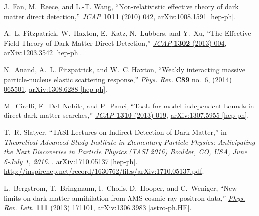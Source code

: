 \documentclass[aps,prd,letterpaper,showpacs,twocolumn,preprintnumbers,floatfix,superscriptaddress]{revtex4-1}
\begin{document}
\begin{thebibliography}{99}
J.~Fan, M.~Reece, and L.-T. Wang, ``{Non-relativistic effective theory of dark
  matter direct detection},''
  \href{http://dx.doi.org/10.1088/1475-7516/2010/11/042}{{\em JCAP} {\bfseries
  1011} (2010) 042},
\href{http://arxiv.org/abs/1008.1591}{{\ttfamily arXiv:1008.1591 [hep-ph]}}.

A.~L. Fitzpatrick, W.~Haxton, E.~Katz, N.~Lubbers, and Y.~Xu, ``{The Effective
  Field Theory of Dark Matter Direct Detection},''
  \href{http://dx.doi.org/10.1088/1475-7516/2013/02/004}{{\em JCAP} {\bfseries
  1302} (2013) 004},
\href{http://arxiv.org/abs/1203.3542}{{\ttfamily arXiv:1203.3542 [hep-ph]}}.

N.~Anand, A.~L. Fitzpatrick, and W.~C. Haxton, ``{Weakly interacting massive
  particle-nucleus elastic scattering response},''
  \href{http://dx.doi.org/10.1103/PhysRevC.89.065501}{{\em Phys. Rev.}
  {\bfseries C89} no.~6, (2014) 065501},
\href{http://arxiv.org/abs/1308.6288}{{\ttfamily arXiv:1308.6288 [hep-ph]}}.

M.~Cirelli, E.~Del~Nobile, and P.~Panci, ``{Tools for model-independent bounds
  in direct dark matter searches},''
  \href{http://dx.doi.org/10.1088/1475-7516/2013/10/019}{{\em JCAP} {\bfseries
  1310} (2013) 019},
\href{http://arxiv.org/abs/1307.5955}{{\ttfamily arXiv:1307.5955 [hep-ph]}}.

T.~R. Slatyer, ``{TASI Lectures on Indirect Detection of Dark Matter},'' in
  {\em {Theoretical Advanced Study Institute in Elementary Particle Physics:
  Anticipating the Next Discoveries in Particle Physics (TASI 2016) Boulder,
  CO, USA, June 6-July 1, 2016}}.
.
\newblock \href{http://arxiv.org/abs/1710.05137}{{\ttfamily arXiv:1710.05137
  [hep-ph]}}.
\newblock
\url{http://inspirehep.net/record/1630762/files/arXiv:1710.05137.pdf}.
\newblock

L.~Bergstrom, T.~Bringmann, I.~Cholis, D.~Hooper, and C.~Weniger, ``{New limits
  on dark matter annihilation from AMS cosmic ray positron data},''
  \href{http://dx.doi.org/10.1103/PhysRevLett.111.171101}{{\em Phys. Rev.
  Lett.} {\bfseries 111} (2013) 171101},
\href{http://arxiv.org/abs/1306.3983}{{\ttfamily arXiv:1306.3983
  [astro-ph.HE]}}.


\end{thebibliography}
\end{document}

